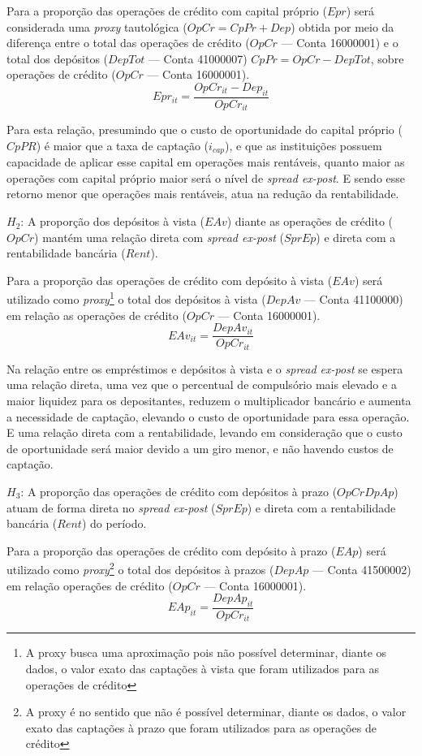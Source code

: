 \documentclass[12pt,12pt,openright,oneside,a4paper,chapter=TITLE,section=TITLE,subsection=TITLE,subsubsection=TITLE,english,french,spanish,portugues,sumario=tradicional]{abntex2}
\begin{document}
Para a proporção das operações de crédito com capital próprio (\(Epr\)) será considerada uma \emph{proxy} tautológica (\(OpCr = CpPr + Dep\)) obtida por meio da diferença entre o total das operações de crédito (\(OpCr\) --- Conta 16000001) e o total dos depósitos (\(DepTot\) --- Conta 41000007) \(CpPr = OpCr - DepTot\), sobre operações de crédito (\(OpCr\) --- Conta 16000001).
\[
Epr_{it} = \frac{OpCr_{it} - Dep_{it}}{OpCr_{it}}
\]

Para esta relação, presumindo que o custo de oportunidade do capital próprio (\(CpPR\)) é maior que a taxa de captação (\(i_{cap}\)), e que as instituições possuem capacidade de aplicar esse capital em operações mais rentáveis, quanto maior as operações com capital próprio maior será o nível de \emph{spread ex-post}. E sendo esse retorno menor que operações mais rentáveis, atua na redução da rentabilidade.

\(H_{2}\): A proporção dos depósitos à vista (\(EAv\)) diante as operações de crédito (\(OpCr\)) mantém uma relação direta com \emph{spread ex-post} (\(SprEp\)) e direta com a rentabilidade bancária (\(Rent\)).

Para a proporção das operações de crédito com depósito à vista (\(EAv\)) será utilizado como \emph{proxy}\footnote{A proxy busca uma aproximação pois não possível determinar, diante os dados, o valor exato das captações à vista que foram utilizados para as operações de crédito} o total dos depósitos à vista (\(DepAv\) --- Conta 41100000) em relação as operações de crédito (\(OpCr\) --- Conta 16000001).
\[
EAv_{it} = \frac{DepAv_{it}}{OpCr_{it}}
\]

Na relação entre os empréstimos e depósitos à vista e o \emph{spread ex-post} se espera uma relação direta, uma vez que o percentual de compulsório mais elevado e a maior liquidez para os depositantes, reduzem o multiplicador bancário e aumenta a necessidade de captação, elevando o custo de oportunidade para essa operação. E uma relação direta com a rentabilidade, levando em consideração que o custo de oportunidade será maior devido a um giro menor, e não havendo custos de captação.

\(H_{3}\): A proporção das operações de crédito com depósitos à prazo (\(OpCrDpAp\)) atuam de forma direta no \emph{spread ex-post} (\(SprEp\)) e direta com a rentabilidade bancária (\(Rent\)) do período.

Para a proporção das operações de crédito com depósito à prazo (\(EAp\)) será utilizado como \emph{proxy}\footnote{A proxy é no sentido que não é possível determinar, diante os dados, o valor exato das captações à prazo que foram utilizados para as operações de crédito} o total dos depósitos à prazos (\(DepAp\) --- Conta 41500002) em relação operações de crédito (\(OpCr\) --- Conta 16000001).
\[
EAp_{it} = \frac{DepAp_{it}}{OpCr_{it}}
\]
\end{document}
